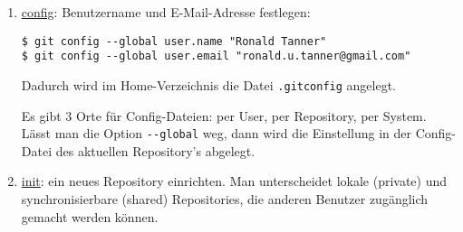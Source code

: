 \begin{enumerate}
\item \underline{config}: Benutzername und E-Mail-Adresse festlegen:
  \begin{lstlisting}
$ git config --global user.name "Ronald Tanner"
$ git config --global user.email "ronald.u.tanner@gmail.com"
  \end{lstlisting}
Dadurch wird im Home-Verzeichnis die Datei \verb+.gitconfig+ angelegt.

Es gibt 3 Orte für
Config-Dateien: per User, per Repository, per System. Lässt man
die
Option \verb+--global+ weg, dann wird die Einstellung in der
Config-Datei des aktuellen Repository's abgelegt.
%
\newslide
\item \underline{init}: ein neues Repository einrichten. Man
  unterscheidet lokale (private) und synchronisierbare (shared)
  Repositories, die anderen Benutzer zugänglich gemacht werden können.


\end{enumerate}
